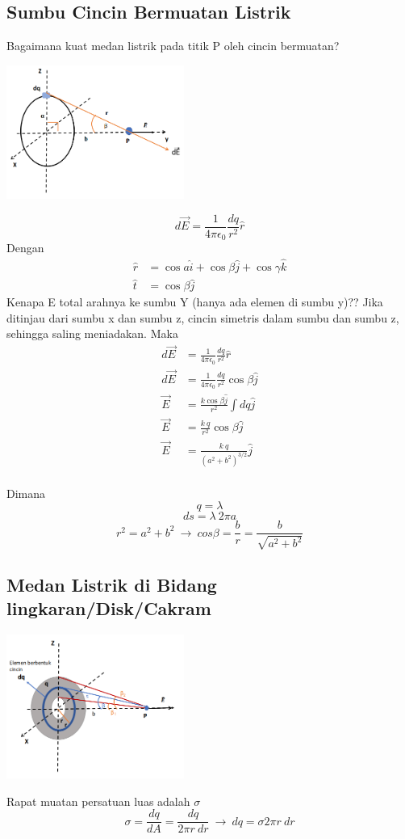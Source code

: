 \documentclass[twocolumn, 11pt]{article}%
\begin{document}
    \subsection{Sumbu Cincin Bermuatan Listrik}%
    Bagaimana kuat medan listrik pada titik P oleh cincin bermuatan?
    \begin{center}
        \includegraphics[width=220px]{14.png}
    \end{center}

    \[ d \vec E = \frac1{4\pi \epsilon_0} \frac{dq}{r^2} \hat r \]
    Dengan 
    \begin{align*}
        \hat r &= \cos a\hat i + \cos \beta \hat j + \cos \gamma \hat k\\
        \hat t &= \cos \beta \hat j
    \end{align*}
    Kenapa E total arahnya ke sumbu Y (hanya ada elemen di sumbu y)?? Jika ditinjau dari sumbu x dan sumbu z, cincin simetris dalam sumbu dan sumbu z, sehingga saling meniadakan. Maka
    \begin{align*}
        d \vec E&=\frac1{4\pi \epsilon_0}\frac{dq}{r^2} \hat r\\
        d \vec E&=\frac1{4\pi \epsilon_0}\frac{dq}{r^2} \cos \beta\hat j\\
        \vec E&=\frac{k\cos \beta\hat j}{r^2}\int dq\hat j\\
        \vec E&=\frac{k\ q}{r^2}\cos \beta \hat j\\
        \vec E&=\frac{k\ q}{(a^2+b^2)^{3/2}}\hat j\\
    \end{align*} 

    Dimana
    \[ q=\lambda \]
    \[ ds=\lambda\ 2\pi a \]
    \[ r^2=a^2+b^2\ \rightarrow\ cos \beta = \frac{b}r = \frac{b}{\sqrt{a^2+b^2}} \]

    \subsection{Medan Listrik di Bidang lingkaran/Disk/Cakram}%
    \begin{center}
        \includegraphics[width=220px]{15.png}
    \end{center}
    Rapat muatan persatuan luas adalah $\sigma$
    \[ \sigma=\frac{dq}{dA}= \frac{dq}{2\pi r\ dr}\ \rightarrow\ dq=\sigma2\pi r\ dr \]
\end{document}
